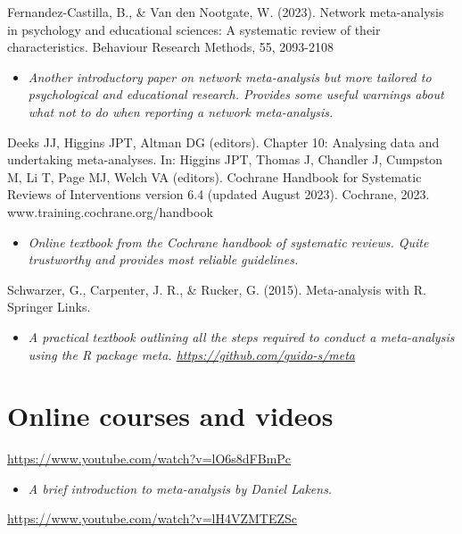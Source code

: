 \documentclass[
]{book}
\providecommand{\tightlist}{%
  \setlength{\itemsep}{0pt}\setlength{\parskip}{0pt}}
\begin{document}
Fernandez-Castilla, B., \& Van den Nootgate, W. (2023). Network meta-analysis in psychology and educational sciences: A systematic review of their characteristics. Behaviour Research Methods, 55, 2093-2108

\begin{itemize}
\tightlist
\item
  \emph{Another introductory paper on network meta-analysis but more tailored to psychological and educational research. Provides some useful warnings about what not to do when reporting a network meta-analysis.}
\end{itemize}

Deeks JJ, Higgins JPT, Altman DG (editors). Chapter 10: Analysing data and undertaking meta-analyses. In: Higgins JPT, Thomas J, Chandler J, Cumpston M, Li T, Page MJ, Welch VA (editors). Cochrane Handbook for Systematic Reviews of Interventions version 6.4 (updated August 2023). Cochrane, 2023. www.training.cochrane.org/handbook

\begin{itemize}
\tightlist
\item
  \emph{Online textbook from the Cochrane handbook of systematic reviews. Quite trustworthy and provides most reliable guidelines.}
\end{itemize}

Schwarzer, G., Carpenter, J. R., \& Rucker, G. (2015). Meta-analysis with R. Springer Links.

\begin{itemize}
\tightlist
\item
  \emph{A practical textbook outlining all the steps required to conduct a meta-analysis using the R package meta. \url{https://github.com/guido-s/meta} }
\end{itemize}

\hypertarget{online-courses-and-videos-3}{%
\section{Online courses and videos}\label{online-courses-and-videos-3}}

\url{https://www.youtube.com/watch?v=lO6s8dFBmPc}

\begin{itemize}
\tightlist
\item
  \emph{A brief introduction to meta-analysis by Daniel Lakens.}
\end{itemize}

\url{https://www.youtube.com/watch?v=lH4VZMTEZSc}
\end{document}
